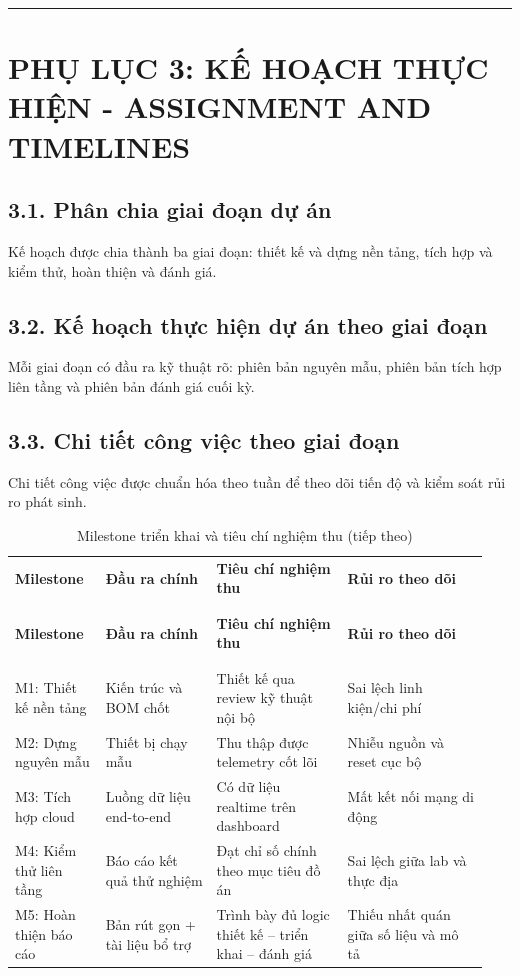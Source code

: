 \documentclass[a4paper]{extarticle}
\newcommand{\appendixsection}[1]{\clearpage\section{#1}}
\newcommand{\thesissettableid}[2]{%
  \renewcommand{\thetable}{#1}%
  \renewcommand{\theHtable}{#2}%
}
\begin{document}
\begin{center}\rule{0.5\linewidth}{0.5pt}\end{center}

\appendixsection{PHỤ LỤC 3: KẾ HOẠCH THỰC HIỆN - ASSIGNMENT AND TIMELINES}

\subsection{3.1. Phân chia giai đoạn dự án}

Kế hoạch được chia thành ba giai đoạn: thiết kế và dựng nền tảng, tích hợp và kiểm thử, hoàn thiện và đánh giá.

\subsection{3.2. Kế hoạch thực hiện dự án theo giai đoạn}

Mỗi giai đoạn có đầu ra kỹ thuật rõ: phiên bản nguyên mẫu, phiên bản tích hợp liên tầng và phiên bản đánh giá cuối kỳ.

\subsection{3.3. Chi tiết công việc theo giai đoạn}

Chi tiết công việc được chuẩn hóa theo tuần để theo dõi tiến độ và kiểm soát rủi ro phát sinh.

{\thesissettableid{PL-3.1}{tab-condensed-app3-milestones}
\def\LTcaptype{table}
\begin{longtable}{|L{0.180\linewidth}|L{0.220\linewidth}|L{0.260\linewidth}|L{0.280\linewidth}|}
\caption{Milestone triển khai và tiêu chí nghiệm thu}\label{tab:condensed-app3-milestones}\\
\hline \textbf{Milestone} & \textbf{Đầu ra chính} & \textbf{Tiêu chí nghiệm thu} & \textbf{Rủi ro theo dõi} \\
\\\hline
\endfirsthead
\caption[]{Milestone triển khai và tiêu chí nghiệm thu (tiếp theo)}\\
\hline \textbf{Milestone} & \textbf{Đầu ra chính} & \textbf{Tiêu chí nghiệm thu} & \textbf{Rủi ro theo dõi} \\
\\\hline
\endhead
\\\hline
\endfoot
\endlastfoot
M1: Thiết kế nền tảng & Kiến trúc và BOM chốt & Thiết kế qua review kỹ thuật nội bộ & Sai lệch linh kiện/chi phí \\\hline
M2: Dựng nguyên mẫu & Thiết bị chạy mẫu & Thu thập được telemetry cốt lõi & Nhiễu nguồn và reset cục bộ \\\hline
M3: Tích hợp cloud & Luồng dữ liệu end-to-end & Có dữ liệu realtime trên dashboard & Mất kết nối mạng di động \\\hline
M4: Kiểm thử liên tầng & Báo cáo kết quả thử nghiệm & Đạt chỉ số chính theo mục tiêu đồ án & Sai lệch giữa lab và thực địa \\\hline
M5: Hoàn thiện báo cáo & Bản rút gọn + tài liệu bổ trợ & Trình bày đủ logic thiết kế -- triển khai -- đánh giá & Thiếu nhất quán giữa số liệu và mô tả \\\hline
\end{longtable}
}
\end{document}
